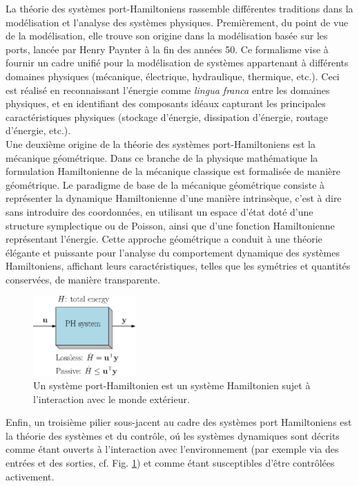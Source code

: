 \documentclass[12pt, french]{article}
\begin{document}
	La théorie des systèmes port-Hamiltoniens rassemble différentes traditions dans la modélisation et l'analyse des systèmes physiques. Premièrement, du point de vue de la modélisation, elle trouve son origine dans la modélisation basée sur les ports, lancée par Henry Paynter à la fin des années 50. Ce formalisme vise à fournir un cadre unifié pour la modélisation de systèmes appartenant à différents domaines physiques (mécanique, électrique, hydraulique, thermique, etc.). Ceci est réalisé en reconnaissant l'énergie comme \textit{lingua franca} entre les domaines physiques, et en identifiant des composants idéaux capturant les principales caractéristiques physiques (stockage d'énergie, dissipation d'énergie, routage d'énergie, etc.).  \\
	
	Une deuxième origine de la théorie des systèmes port-Hamiltoniens est la mécanique géométrique. Dans ce branche de la physique mathématique la formulation Hamiltonienne de la mécanique classique est formalisée de manière géométrique. Le paradigme de base
	de la mécanique géométrique consiste à représenter la dynamique Hamiltonienne d'une manière intrinsèque, c'est à dire sans introduire des coordonnées, en utilisant un espace d'état doté d'une structure symplectique ou de Poisson, ainsi que d'une fonction Hamiltonienne représentant l'énergie. Cette
	approche géométrique a conduit à une théorie élégante et puissante pour
	l'analyse du comportement dynamique des systèmes Hamiltoniens, affichant leurs caractéristiques, telles que les symétries et quantités conservées, de manière transparente. \\
	
	\begin{figure}[hbt]
		\begin{center}
			\includegraphics[width=0.35\textwidth]{sketch_PH.eps}
		\end{center}
		\caption{Un système port-Hamiltonien est un système Hamiltonien sujet \`a l'interaction avec le monde extérieur.}
		\label{fig:sketchPH}
	\end{figure}
	
	Enfin, un troisième pilier sous-jacent au cadre des systèmes port Hamiltoniens est la théorie des systèmes et du contrôle, o\'u les systèmes dynamiques sont décrits comme étant ouverts à l'interaction avec l'environnement (par exemple via des entrées et des sorties, cf. Fig. \ref{fig:sketchPH}) et comme étant susceptibles d'être contrôlées activement. \\
	
\end{document}
